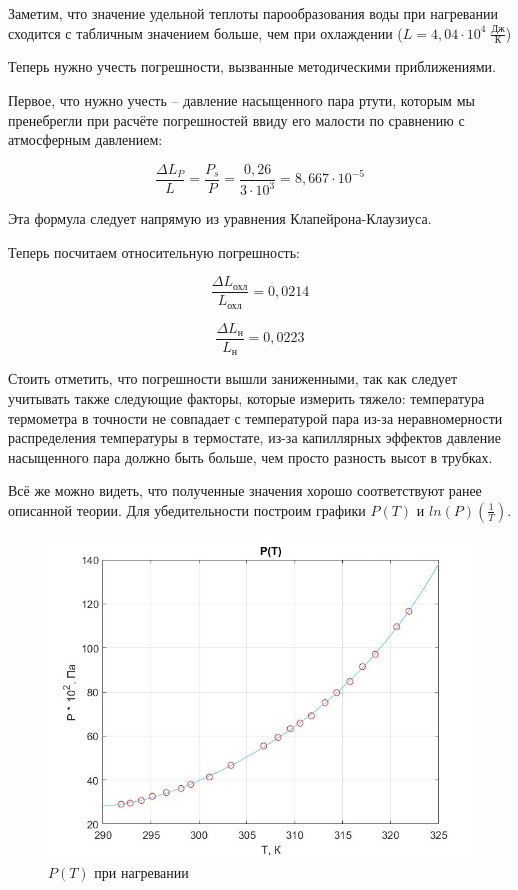 \documentclass[a4paper, 12pt]{article} %
\begin{document}
Заметим, что значение удельной теплоты парообразования воды при нагревании сходится с табличным значением больше, чем при охлаждении ($L = 4,04 \cdot 10^4 \; \frac{\text{Дж}}{\text{К}}$)

Теперь нужно учесть погрешности, вызванные методическими приближениями. 

Первое, что нужно учесть -- давление насыщенного пара ртути, которым мы пренебрегли при расчёте погрешностей ввиду его малости по сравнению с атмосферным давлением:

\begin{equation}
    \frac{\Delta L_P  }{L} = \frac{P_s}{P} = \frac{0,26}{3 \cdot 10^3} = 8,667 \cdot 10^{-5}
\end{equation}

Эта формула следует напрямую из уравнения Клапейрона-Клаузиуса.

Теперь посчитаем относительную погрешность:

\begin{equation}
    \frac{\Delta L_{\text{охл}}}{L_{\text{охл}}} = 0,0214
\end{equation}

\begin{equation}
    \frac{\Delta L_{\text{н}}}{L_{\text{н}}} = 0,0223
\end{equation}

Стоить отметить, что погрешности вышли заниженными, так как следует учитывать также следующие факторы, которые измерить тяжело: температура термометра в точности не совпадает с температурой пара из-за неравномерности распределения температуры в термостате, из-за капиллярных эффектов давление насыщенного пара должно быть больше, чем просто разность высот в трубках.

Всё же можно видеть, что полученные значения хорошо соответствуют ранее описанной теории. Для убедительности построим графики $P(T)$ и $ln(P)\left( \frac{1}{T}\right)$.

\begin{figure}
    \begin{center}
        \includegraphics[scale = 0.45]{graph1}
        \caption{$P(T)$ при нагревании}
    \end{center}
\end{figure}
\end{document}
